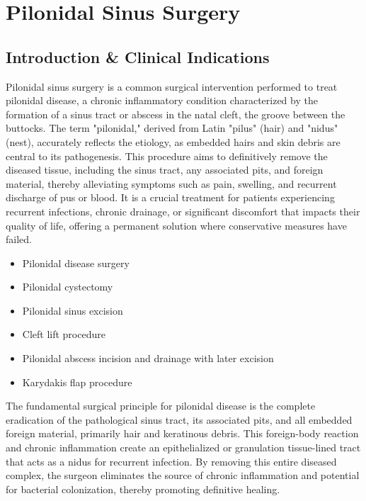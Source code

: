 \chapter{Pilonidal Sinus Surgery}

\section*{Introduction \& Clinical Indications}
Pilonidal sinus surgery is a common surgical intervention performed to treat pilonidal disease, a chronic inflammatory condition characterized by the formation of a sinus tract or abscess in the natal cleft, the groove between the buttocks. The term "pilonidal," derived from Latin "pilus" (hair) and "nidus" (nest), accurately reflects the etiology, as embedded hairs and skin debris are central to its pathogenesis. This procedure aims to definitively remove the diseased tissue, including the sinus tract, any associated pits, and foreign material, thereby alleviating symptoms such as pain, swelling, and recurrent discharge of pus or blood. It is a crucial treatment for patients experiencing recurrent infections, chronic drainage, or significant discomfort that impacts their quality of life, offering a permanent solution where conservative measures have failed.

\begin{itemize}
  \item Pilonidal disease surgery
  \item Pilonidal cystectomy
  \item Pilonidal sinus excision
  \item Cleft lift procedure
  \item Pilonidal abscess incision and drainage with later excision
  \item Karydakis flap procedure
\end{itemize}

The fundamental surgical principle for pilonidal disease is the complete eradication of the pathological sinus tract, its associated pits, and all embedded foreign material, primarily hair and keratinous debris. This foreign-body reaction and chronic inflammation create an epithelialized or granulation tissue-lined tract that acts as a nidus for recurrent infection. By removing this entire diseased complex, the surgeon eliminates the source of chronic inflammation and potential for bacterial colonization, thereby promoting definitive healing.

